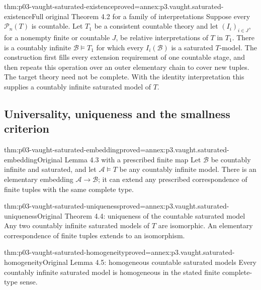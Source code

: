 \begin{hbtheorem}{thm:p03-vaught-saturated-existence}{proved=annex:p3.vaught.saturated-existence}{Full original Theorem 4.2 for a family of interpretations}
Suppose every \(\mathcal P_n(T)\) is countable.
Let \(T_1\) be a consistent countable theory and let
\((I_i)_{i\in J}\), for a nonempty finite or countable \(J\), be
relative interpretations of \(T\) in \(T_1\).
There is a countably infinite \(\mathcal B\models T_1\) for which
every \(I_i(\mathcal B)\) is a saturated \(T\)-model.
The construction first fills every extension requirement of one
countable stage, and then repeats this operation over an outer
elementary chain to cover new tuples.
The target theory need not be complete.
With the identity interpretation this supplies a countably infinite
saturated model of \(T\).
\end{hbtheorem}

\subsection{Universality, uniqueness and the smallness criterion}
\label{sec:p03-vaught-universality}

\begin{hblemma}{thm:p03-vaught-saturated-embedding}{proved=annex:p3.vaught.saturated-embedding}{Original Lemma 4.3 with a prescribed finite map}
Let \(\mathcal B\) be countably infinite and saturated, and let
\(\mathcal A\models T\) be any countably infinite model.
There is an elementary embedding \(\mathcal A\to\mathcal B\);
it can extend any prescribed correspondence of finite tuples
with the same complete type.
\end{hblemma}

\begin{hbtheorem}{thm:p03-vaught-saturated-uniqueness}{proved=annex:p3.vaught.saturated-uniqueness}{Original Theorem 4.4: uniqueness of the countable saturated model}
Any two countably infinite saturated models of \(T\) are isomorphic.
An elementary correspondence of finite tuples extends to an isomorphism.
\end{hbtheorem}

\begin{hblemma}{thm:p03-vaught-saturated-homogeneity}{proved=annex:p3.vaught.saturated-homogeneity}{Original Lemma 4.5: homogeneous countable saturated models}
Every countably infinite saturated model is homogeneous
in the stated finite complete-type sense.
\end{hblemma}

